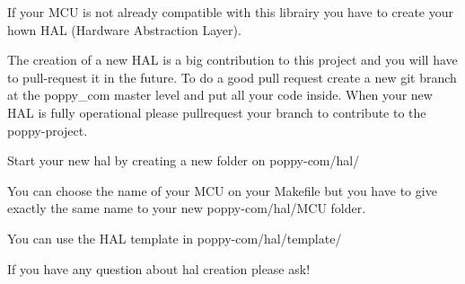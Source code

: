 If your M\-C\-U is not already compatible with this librairy you have to create your hown H\-A\-L (Hardware Abstraction Layer).

The creation of a new H\-A\-L is a big contribution to this project and you will have to pull-\/request it in the future. To do a good pull request create a new git branch at the poppy\-\_\-com master level and put all your code inside. When your new H\-A\-L is fully operational please pullrequest your branch to contribute to the poppy-\/project.

Start your new hal by creating a new folder on poppy-\/com/hal/

You can choose the name of your M\-C\-U on your Makefile but you have to give exactly the same name to your new poppy-\/com/hal/\-M\-C\-U folder.

You can use the H\-A\-L template in poppy-\/com/hal/template/

If you have any question about hal creation please ask! 